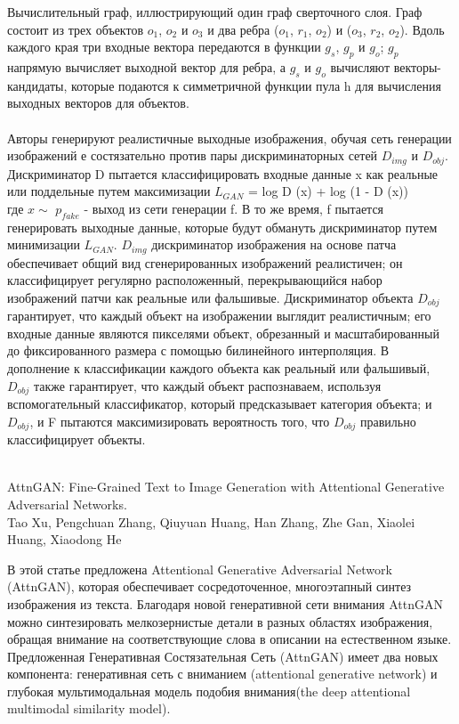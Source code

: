 \documentclass{article}
\begin{document}
  \large Вычислительный граф, иллюстрирующий один граф сверточного слоя. Граф состоит из трех объектов $o_{1}$, $o_{2}$ и $o_{3}$ и
два ребра ($o_{1}$, $r_{1}$, $o_{2}$) и ($o_{3}$, $r_{2}$, $o_{2}$). Вдоль каждого края три
входные вектора передаются в функции $g_{s}$, $g_{p}$ и $g_{o}$; $g_{p}$ напрямую
вычисляет выходной вектор для ребра, а $g_{s}$ и $g_{o}$ вычисляют
векторы-кандидаты, которые подаются к симметричной функции пула
h для вычисления выходных векторов для объектов.\\ \\
Авторы генерируют реалистичные выходные изображения,
обучая сеть генерации изображений е состязательно
против пары дискриминаторных сетей $D_{img}$ и $D_{obj}$.
Дискриминатор D пытается классифицировать входные данные x как реальные
или поддельные путем максимизации $L_{GAN}$ =  log D (x) +  log (1 - D (x))\\
где $x\sim$ $p_{fake}$ - выход из сети генерации f.
В то же время, f пытается генерировать выходные данные, которые будут
обмануть дискриминатор путем минимизации $L_{GAN}$.
$D_{img}$ дискриминатор изображения на основе патча обеспечивает
общий вид сгенерированных изображений реалистичен;
он классифицирует регулярно расположенный, перекрывающийся набор изображений
патчи как реальные или фальшивые.
Дискриминатор объекта $D_{obj}$ гарантирует, что каждый объект
на изображении выглядит реалистичным; его входные данные являются пикселями
объект, обрезанный и масштабированный до фиксированного размера с помощью билинейного
интерполяция. В дополнение к классификации каждого объекта как
реальный или фальшивый, $D_{obj}$ также гарантирует, что каждый объект распознаваем, используя вспомогательный классификатор, который предсказывает
категория объекта; и $D_{obj}$, и F пытаются максимизировать
вероятность того, что $D_{obj}$ правильно классифицирует объекты.\\ \\

\begin{center} 
      \huge AttnGAN: Fine-Grained Text to Image Generation
with Attentional Generative Adversarial Networks.\\
      Tao Xu, Pengchuan Zhang, Qiuyuan Huang, Han Zhang, Zhe Gan, Xiaolei Huang, Xiaodong He\\ [1.3cm]
    \end{center} 
      \large В этой статье предложена Attentional Generative Adversarial Network (AttnGAN), которая обеспечивает сосредоточенное,
многоэтапный синтез изображения из текста. Благодаря новой генеративной сети внимания AttnGAN можно синтезировать мелкозернистые детали в разных областях изображения, обращая внимание на соответствующие слова в описании на естественном языке.
Предложенная Генеративная Состязательная Сеть (AttnGAN) имеет два новых компонента: генеративная сеть с вниманием (attentional generative network) и глубокая
мультимодальная модель подобия внимания(the deep
attentional multimodal similarity model).\\
\end{document}
